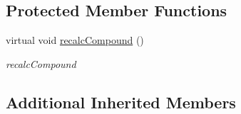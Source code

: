\subsection*{Protected Member Functions}
\begin{DoxyCompactItemize}
\item 
virtual void \hyperlink{classcanvascv_1_1VerticalLayout_a0d4661776d5cb6dc4eccebcb3e5ff17c}{recalc\+Compound} ()
\begin{DoxyCompactList}\small\item\em recalc\+Compound \end{DoxyCompactList}\end{DoxyCompactItemize}
\subsection*{Additional Inherited Members}


